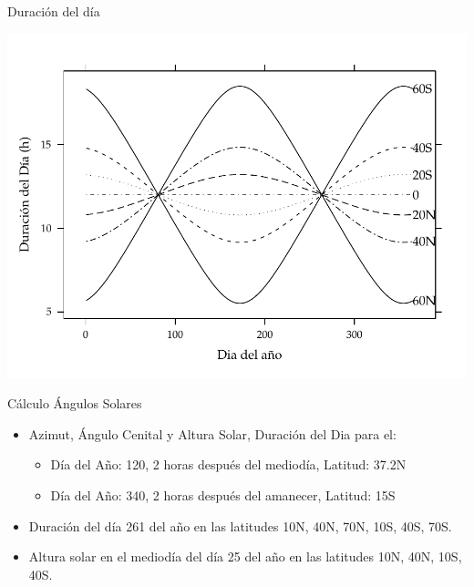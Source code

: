 \documentclass[xcolor={usenames,svgnames,dvipsnames}]{beamer}
\begin{document}
\begin{frame}[label={sec:org0891361}]{Duración del día}
\begin{center}
\includegraphics[width=.9\linewidth]{../figs/DuracionDia.pdf}
\end{center}
\end{frame}

\begin{frame}[label={sec:org907f66c}]{Cálculo Ángulos Solares}
\begin{itemize}
\item Azimut, Ángulo Cenital y Altura Solar, Duración del Dia para el:

\begin{itemize}
\item Día del Año: 120, 2 horas después del mediodía, Latitud: 37.2N

\item Día del Año: 340, 2 horas después del amanecer, Latitud: 15S
\end{itemize}

\item Duración del día 261 del año en las latitudes 10N, 40N, 70N, 10S,
40S, 70S.

\item Altura solar en el mediodía del día 25 del año en las latitudes 10N,
40N, 10S, 40S.
\end{itemize}
\end{frame}
\end{document}

